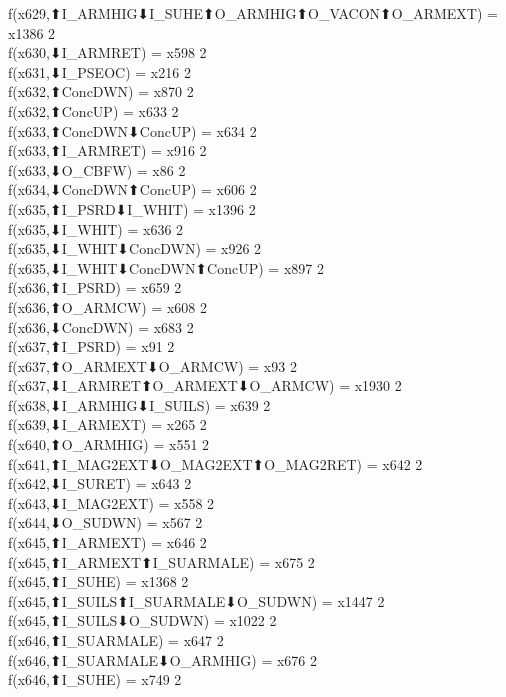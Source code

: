 f(x629,⬆I_ARMHIG⬇I_SUHE⬆O_ARMHIG⬆O_VACON⬆O_ARMEXT) = x1386 {2} \\
f(x630,⬇I_ARMRET) = x598 {2} \\
f(x631,⬇I_PSEOC) = x216 {2} \\
f(x632,⬆ConcDWN) = x870 {2} \\
f(x632,⬆ConcUP) = x633 {2} \\
f(x633,⬆ConcDWN⬇ConcUP) = x634 {2} \\
f(x633,⬆I_ARMRET) = x916 {2} \\
f(x633,⬇O_CBFW) = x86 {2} \\
f(x634,⬇ConcDWN⬆ConcUP) = x606 {2} \\
f(x635,⬆I_PSRD⬇I_WHIT) = x1396 {2} \\
f(x635,⬇I_WHIT) = x636 {2} \\
f(x635,⬇I_WHIT⬇ConcDWN) = x926 {2} \\
f(x635,⬇I_WHIT⬇ConcDWN⬆ConcUP) = x897 {2} \\
f(x636,⬆I_PSRD) = x659 {2} \\
f(x636,⬆O_ARMCW) = x608 {2} \\
f(x636,⬇ConcDWN) = x683 {2} \\
f(x637,⬆I_PSRD) = x91 {2} \\
f(x637,⬆O_ARMEXT⬇O_ARMCW) = x93 {2} \\
f(x637,⬇I_ARMRET⬆O_ARMEXT⬇O_ARMCW) = x1930 {2} \\
f(x638,⬇I_ARMHIG⬇I_SUILS) = x639 {2} \\
f(x639,⬇I_ARMEXT) = x265 {2} \\
f(x640,⬆O_ARMHIG) = x551 {2} \\
f(x641,⬆I_MAG2EXT⬇O_MAG2EXT⬆O_MAG2RET) = x642 {2} \\
f(x642,⬇I_SURET) = x643 {2} \\
f(x643,⬇I_MAG2EXT) = x558 {2} \\
f(x644,⬇O_SUDWN) = x567 {2} \\
f(x645,⬆I_ARMEXT) = x646 {2} \\
f(x645,⬆I_ARMEXT⬆I_SUARMALE) = x675 {2} \\
f(x645,⬆I_SUHE) = x1368 {2} \\
f(x645,⬆I_SUILS⬆I_SUARMALE⬇O_SUDWN) = x1447 {2} \\
f(x645,⬆I_SUILS⬇O_SUDWN) = x1022 {2} \\
f(x646,⬆I_SUARMALE) = x647 {2} \\
f(x646,⬆I_SUARMALE⬇O_ARMHIG) = x676 {2} \\
f(x646,⬆I_SUHE) = x749 {2} \\
